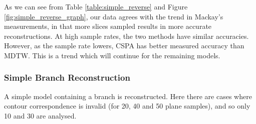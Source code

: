 \documentclass[11p, titlepage]{article}
\begin{document}
As we can see from Table \ref{table:simple_reverse} and Figure \ref{fig:simple_reverse_graph}, our data agrees with the trend in Mackay's measurements, in that more slices sampled results in more accurate reconstructions. At high sample rates, the two methods have similar accuracies. However, as the sample rate lowers, CSPA has better measured accuracy than MDTW. This is a trend which will continue for the remaining models.
\pagebreak

\subsubsection{Simple Branch Reconstruction}

A simple model containing a branch is reconstructed. Here there are cases where contour correspondence is invalid (for 20, 40 and 50 plane samples), and so only 10 and 30 are analysed.
\end{document}
